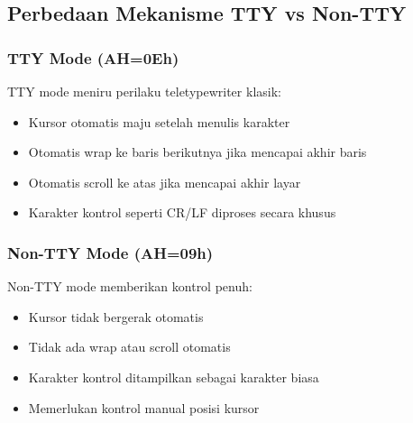 \documentclass[../main.tex]{subfiles}
\begin{document}
        \subsection{Perbedaan Mekanisme TTY vs Non-TTY}
            \subsubsection{TTY Mode (AH=0Eh)}
                TTY mode meniru perilaku teletypewriter klasik:
                \begin{itemize}
                    \item Kursor otomatis maju setelah menulis karakter
                    \item Otomatis wrap ke baris berikutnya jika mencapai akhir baris
                    \item Otomatis scroll ke atas jika mencapai akhir layar
                    \item Karakter kontrol seperti CR/LF diproses secara khusus
                \end{itemize}

            \subsubsection{Non-TTY Mode (AH=09h)}
                Non-TTY mode memberikan kontrol penuh:
                \begin{itemize}
                    \item Kursor tidak bergerak otomatis
                    \item Tidak ada wrap atau scroll otomatis
                    \item Karakter kontrol ditampilkan sebagai karakter biasa
                    \item Memerlukan kontrol manual posisi kursor
                \end{itemize}
\end{document}
